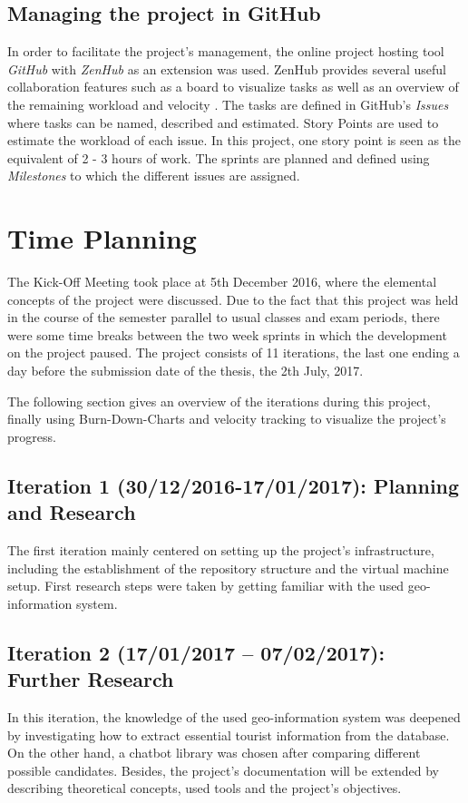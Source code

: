 \subsection{Managing the project in GitHub}
In order to facilitate the project’s management, the online project hosting tool \textit{GitHub} \cite{github:about} with \textit{ZenHub} as an extension was used. ZenHub provides several useful collaboration features such as a board to visualize tasks as well as an overview of the remaining workload and velocity \cite{zenhub}. The tasks are defined in GitHub’s \textit{Issues} where tasks can be named, described and estimated. Story Points are used to estimate the workload of each issue. In this project, one story point is seen as the equivalent of 2 - 3 hours of work. The sprints are planned and defined using \textit{Milestones} to which the different issues are assigned.
	

\section{Time Planning}
The Kick-Off Meeting took place at 5th December 2016, where the elemental concepts of the project were discussed. Due to the fact that this project was held in the course of the semester parallel to usual classes and exam periods, there were some time breaks between the two week sprints in which the development on the project paused. The project consists of 11 iterations, the last one ending a day before the submission date of the thesis, the 2th July, 2017.

The following section gives an overview of the iterations during this project, finally using Burn-Down-Charts and velocity tracking to visualize the project’s progress.

\subsection{Iteration 1 (30/12/2016-17/01/2017): Planning and Research}
The first iteration mainly centered on setting up the project's infrastructure, including the establishment of the repository structure and the virtual machine setup. First research steps were taken by getting familiar with the used geo-information system. 

\subsection{Iteration 2 (17/01/2017 – 07/02/2017): Further Research}
In this iteration, the knowledge of the used geo-information system was deepened by investigating how to extract essential tourist information from the database. On the other hand, a chatbot library was chosen after comparing different possible candidates. Besides, the project's documentation will be extended by describing theoretical concepts, used tools and the project's objectives.

